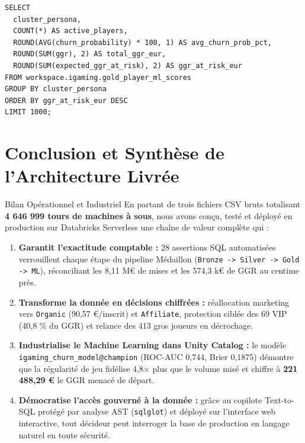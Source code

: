 \documentclass[11pt,a4paper]{article}
\begin{document}
\begin{lstlisting}[style=sqlstyle, caption={Exemple de requête générée et validée par le copilote Text-to-SQL sur la table ML de production.}]
SELECT
  cluster_persona,
  COUNT(*) AS active_players,
  ROUND(AVG(churn_probability) * 100, 1) AS avg_churn_prob_pct,
  ROUND(SUM(ggr), 2) AS total_ggr_eur,
  ROUND(SUM(expected_ggr_at_risk), 2) AS ggr_at_risk_eur
FROM workspace.igaming.gold_player_ml_scores
GROUP BY cluster_persona
ORDER BY ggr_at_risk_eur DESC
LIMIT 1000;
\end{lstlisting}

\section{Conclusion et Synthèse de l'Architecture Livrée}

\begin{successbox}{Bilan Opérationnel et Industriel}
En partant de trois fichiers CSV bruts totalisant \textbf{4 646 999 tours de machines à sous}, nous avons conçu, testé et déployé en production sur Databricks Serverless une chaîne de valeur complète qui :
\begin{enumerate}
    \item \textbf{Garantit l'exactitude comptable :} 28 assertions SQL automatisées verrouillent chaque étape du pipeline Médaillon (\texttt{Bronze -> Silver -> Gold -> ML}), réconciliant les 8,11 M\euro{} de mises et les 574,3 k\euro{} de GGR au centime près.
    \item \textbf{Transforme la donnée en décisions chiffrées :} réallocation marketing vers \texttt{Organic} (90,57 \euro/inscrit) et \texttt{Affiliate}, protection ciblée des 69 VIP (40,8 \% du GGR) et relance des 413 gros joueurs en décrochage.
    \item \textbf{Industrialise le Machine Learning dans Unity Catalog :} le modèle \texttt{igaming\_churn\_model@champion} (ROC-AUC 0,744, Brier 0,1875) démontre que la régularité de jeu fidélise 4,8$\times$ plus que le volume misé et chiffre à \textbf{221 488,29 \euro} le GGR menacé de départ.
    \item \textbf{Démocratise l'accès gouverné à la donnée :} grâce au copilote Text-to-SQL protégé par analyse AST (\texttt{sqlglot}) et déployé sur l'interface web interactive, tout décideur peut interroger la base de production en langage naturel en toute sécurité.
\end{enumerate}
\end{successbox}
\end{document}
